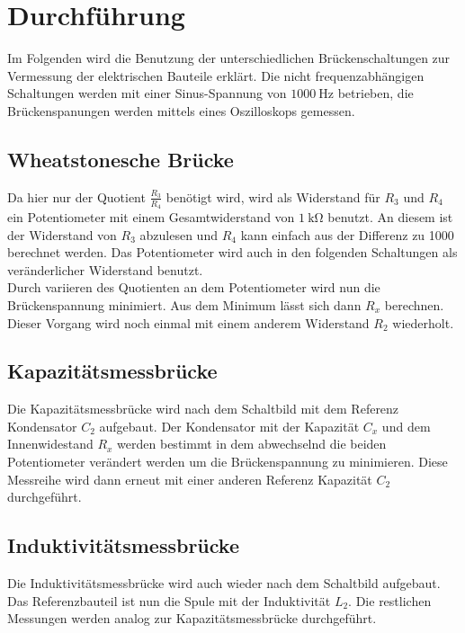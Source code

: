 \section{Durchführung}

    \noindent Im Folgenden wird die Benutzung der unterschiedlichen Brückenschaltungen zur Vermessung der elektrischen Bauteile erklärt. Die 
    nicht frequenzabhängigen Schaltungen werden mit einer Sinus-Spannung von $\SI{1000}{\hertz}$ betrieben, die Brückenspanungen werden mittels 
    eines Oszilloskops gemessen.

    \subsection{Wheatstonesche Brücke}

        \noindent Da hier nur der Quotient $\frac{R_3}{R_4}$ benötigt wird, wird als Widerstand für $R_3$ und $R_4$ ein Potentiometer mit 
        einem Gesamtwiderstand von $\SI{1}{\kilo\ohm}$ benutzt. An diesem ist der Widerstand von $R_3$ abzulesen und $R_4$ kann einfach 
        aus der Differenz zu 1000 berechnet werden. Das Potentiometer wird auch in den folgenden Schaltungen als veränderlicher Widerstand 
        benutzt.\\ Durch variieren des Quotienten an dem Potentiometer wird nun die Brückenspannung minimiert. Aus dem Minimum lässt sich dann 
        $R_x$ berechnen. Dieser Vorgang wird noch einmal mit einem anderem Widerstand $R_2$ wiederholt.

    \subsection{Kapazitätsmessbrücke}

        \noindent Die Kapazitätsmessbrücke wird nach dem Schaltbild mit dem Referenz Kondensator $C_2$ aufgebaut. Der Kondensator mit der 
        Kapazität $C_x$ und dem Innenwidestand $R_x$ werden bestimmt in dem abwechselnd die beiden Potentiometer verändert werden um die 
        Brückenspannung zu minimieren. Diese Messreihe wird dann erneut mit einer anderen Referenz Kapazität $C_2$ durchgeführt.

    \subsection{Induktivitätsmessbrücke}

        \noindent Die Induktivitätsmessbrücke wird auch wieder nach dem Schaltbild aufgebaut. Das Referenzbauteil ist nun die Spule mit 
        der Induktivität $L_2$. Die restlichen Messungen werden analog zur Kapazitätsmessbrücke durchgeführt.

